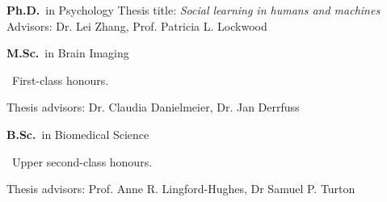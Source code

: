 
	{%
		\textbf{Ph.D.}~in Psychology}
	{%
	Thesis title: \emph{Social learning in humans and machines} \\
	Advisors: Dr. Lei Zhang, Prof. Patricia L. Lockwood}

		{%
			\textbf{M.Sc.}~in Brain Imaging \begin{footnotesize}
			~First-class honours.
		\end{footnotesize}}
		{Thesis advisors: Dr. Claudia Danielmeier, Dr. Jan Derrfuss}

{%
	\textbf{B.Sc.}~in Biomedical Science \begin{footnotesize}
	~Upper second-class honours.
\end{footnotesize}}{Thesis advisors: Prof. Anne R. Lingford-Hughes, Dr Samuel P. Turton}
